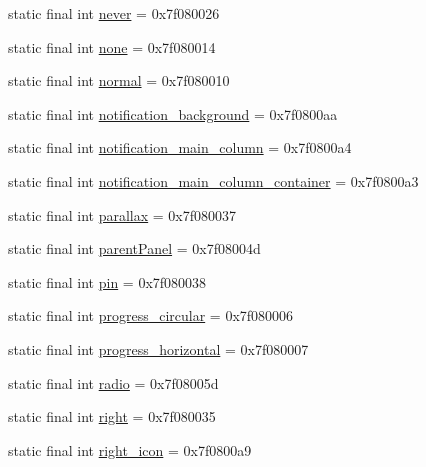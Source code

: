 \begin{CompactItemize}
\item 
static final int \hyperlink{classandroid_1_1support_1_1mediacompat_1_1_r_1_1id_e049f3223d4af47d54639cd2e410af34}{never} = 0x7f080026
\item 
static final int \hyperlink{classandroid_1_1support_1_1mediacompat_1_1_r_1_1id_224cc984b8dfbc9f6d382b652b362d54}{none} = 0x7f080014
\item 
static final int \hyperlink{classandroid_1_1support_1_1mediacompat_1_1_r_1_1id_89da4da44e0b69479738eed0e2d7aec4}{normal} = 0x7f080010
\item 
static final int \hyperlink{classandroid_1_1support_1_1mediacompat_1_1_r_1_1id_ec39d126ef8f583792f1192110fbafba}{notification\_\-background} = 0x7f0800aa
\item 
static final int \hyperlink{classandroid_1_1support_1_1mediacompat_1_1_r_1_1id_f12b3ab461a61c8a7cd3113ffcebb27b}{notification\_\-main\_\-column} = 0x7f0800a4
\item 
static final int \hyperlink{classandroid_1_1support_1_1mediacompat_1_1_r_1_1id_2c549a66a4de84f35156807a5e9b867f}{notification\_\-main\_\-column\_\-container} = 0x7f0800a3
\item 
static final int \hyperlink{classandroid_1_1support_1_1mediacompat_1_1_r_1_1id_e49353cbfa030c00e57e3f866e565d92}{parallax} = 0x7f080037
\item 
static final int \hyperlink{classandroid_1_1support_1_1mediacompat_1_1_r_1_1id_a4329ae5eb4dda9c208a146db33ef2b7}{parentPanel} = 0x7f08004d
\item 
static final int \hyperlink{classandroid_1_1support_1_1mediacompat_1_1_r_1_1id_0ba6cb012e8e8590b8bc19733ce8c41c}{pin} = 0x7f080038
\item 
static final int \hyperlink{classandroid_1_1support_1_1mediacompat_1_1_r_1_1id_344df3dd4a61e7837347370d6f888d79}{progress\_\-circular} = 0x7f080006
\item 
static final int \hyperlink{classandroid_1_1support_1_1mediacompat_1_1_r_1_1id_d2e86f65769e2fe659cf08990b96b310}{progress\_\-horizontal} = 0x7f080007
\item 
static final int \hyperlink{classandroid_1_1support_1_1mediacompat_1_1_r_1_1id_f487c5f06ff9e8d8b005d803347a3b8f}{radio} = 0x7f08005d
\item 
static final int \hyperlink{classandroid_1_1support_1_1mediacompat_1_1_r_1_1id_a962addb902c6db0e8b9d4f565c0138a}{right} = 0x7f080035
\item 
static final int \hyperlink{classandroid_1_1support_1_1mediacompat_1_1_r_1_1id_84c2383643d0d19e74397891620ff513}{right\_\-icon} = 0x7f0800a9

\end{CompactItemize}
